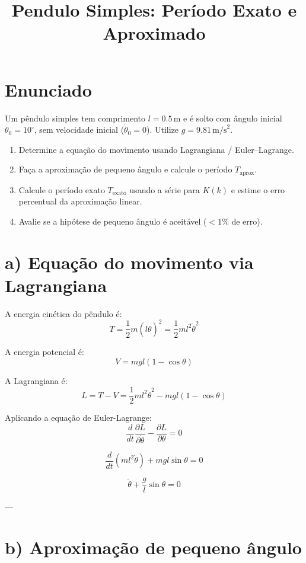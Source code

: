 \documentclass[12pt]{article}
\title{Pendulo Simples: Período Exato e Aproximado}
\author{}
\date{}
\begin{document}
\maketitle

\section*{Enunciado}

Um pêndulo simples tem comprimento \(l = 0.5\,\text{m}\) e é solto com ângulo inicial \(\theta_0 = 10^\circ\), sem velocidade inicial (\(\dot{\theta}_0 = 0\)). Utilize \(g = 9.81\,\text{m/s}^2\).

\begin{enumerate}
    \item Determine a equação do movimento usando Lagrangiana / Euler–Lagrange.
    \item Faça a aproximação de pequeno ângulo e calcule o período \(T_\text{aprox}\).
    \item Calcule o período exato \(T_\text{exato}\) usando a série para \(K(k)\) e estime o erro percentual da aproximação linear.
    \item Avalie se a hipótese de pequeno ângulo é aceitável (\(<1\%\) de erro).
\end{enumerate}

\section*{a) Equação do movimento via Lagrangiana}

A energia cinética do pêndulo é:
\[
T = \frac{1}{2} m (l \dot{\theta})^2 = \frac{1}{2} m l^2 \dot{\theta}^2
\]

A energia potencial é:
\[
V = m g l (1 - \cos\theta)
\]

A Lagrangiana é:
\[
L = T - V = \frac{1}{2} m l^2 \dot{\theta}^2 - m g l (1 - \cos\theta)
\]

Aplicando a equação de Euler-Lagrange:
\[
\frac{d}{dt} \frac{\partial L}{\partial \dot{\theta}} - \frac{\partial L}{\partial \theta} = 0
\]

\[
\frac{d}{dt} (m l^2 \dot{\theta}) + m g l \sin\theta = 0
\]

\[
\boxed{\ddot{\theta} + \frac{g}{l} \sin\theta = 0}
\]

---

\section*{b) Aproximação de pequeno ângulo}
\end{document}
